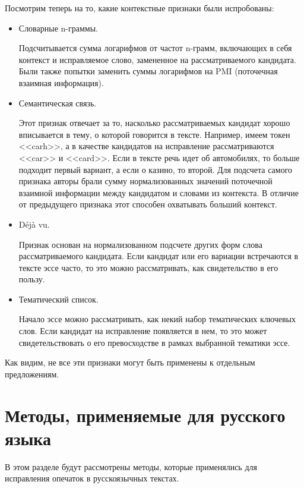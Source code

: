 Посмотрим теперь на то, какие контекстные признаки были испробованы:
\begin{itemize}
	\item Словарные n-граммы. 
	
	Подсчитывается сумма логарифмов от частот n-грамм, включающих в себя контекст и исправляемое слово, замененное на рассматриваемого кандидата. Были также попытки заменить суммы логарифмов на PMI (поточечная взаимная информация).
	\item Семантическая связь. 
	
	Этот признак отвечает за то, насколько рассматриваемых кандидат хорошо вписывается в тему, о которой говорится в тексте. Например, имеем токен <<carh>>, а в качестве кандидатов на исправление рассматриваются <<car>> и <<card>>. Если в тексте речь идет об автомобилях, то больше подходит первый вариант, а если о казино, то второй. Для подсчета самого признака авторы брали сумму нормализованных значений поточечной взаимной информации между кандидатом и словами из контекста. В отличие от предыдущего признака этот способен охватывать больший контекст.
	\item Déjà vu.
	
	Признак основан на нормализованном подсчете других форм слова рассматриваемого кандидата. Если кандидат или его вариации встречаются в тексте эссе часто, то это можно рассматривать, как свидетельство в его пользу. 
	
	\item Тематический список.
	
	Начало эссе можно рассматривать, как некий набор тематических ключевых слов. Если кандидат на исправление появляется в нем, то это может свидетельствовать о его превосходстве в рамках выбранной тематики эссе.
	
\end{itemize}

Как видим, не все эти признаки могут быть применены к отдельным предложениям.

\section{Методы, применяемые для русского языка}

В этом разделе будут рассмотрены методы, которые применялись для исправления опечаток в русскоязычных текстах. 


